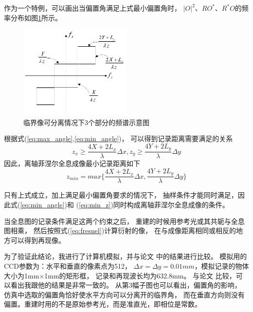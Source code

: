 \documentclass[11pt,a4paper]{article}
\begin{document}
作为一个特例，可以画出当偏置角满足上式最小偏置角时，
$|O|^2$、$RO^*$、$R^*O$的频率分布如图\ref{fig:spectrum}所示。
\begin{figure}[htb]
  \centering
  \includegraphics[width=0.5\textwidth]{spectrum.png}
  \caption{临界像可分离情况下3个部分的频谱示意图}
  \label{fig:spectrum}
\end{figure}

根据式(\ref{eq:max_angle},\ref{eq:min_angle})，
可以得到记录距离需要满足的关系
\begin{equation}
z_x\ge\frac{4X+2L_x}{\lambda}\Delta x,
z_y\ge\frac{4Y+2L_y}{\lambda}\Delta y
\end{equation}
因此，离轴菲涅尔全息成像最小记录距离如下
\begin{equation}
z_{min}=max\{\frac{4X+2L_x}{\lambda}\Delta x, \frac{4Y+2L_y}{\lambda}\Delta y\}
\label{eq:min_z}
\end{equation}

只有上式成立，加上满足最小偏置角要求的情况下，
抽样条件才能同时满足，因此式(\ref{eq:min_angle})和
(\ref{eq:min_z})同时构成离轴菲涅尔全息成像的条件。

当全息图的记录条件满足这两个约束之后，
重建的时候用参考光或其共轭与全息图相乘，
然后按照式(\ref{eq:fresnel})计算衍射的像，
在与成像距离相同或相反的地方可以得到再现像。

为了验证此结论，我进行了计算机模拟，并与论文\cite{王华英2008数字全息显微成像的理论和实验研究}
中的结果进行比较。
模拟用的CCD参数为：水平和垂直的像素点为512，
$\Delta x=\Delta y = 0.01mm$，模拟记录的物体大小为1mm$\times$1mm的矩形框，
记录和再现波长均为632.8mm。
与论文\cite{王华英2008数字全息显微成像的理论和实验研究}
比较，可以看出我跟他的结果是非常一致的。
从第3幅子图也可以看出，偏置角的影响，
仿真中选取的偏置角恰好使水平方向可以分离开的临界角，
而在垂直方向则没有偏置。重建时用的不是原始参考光，而是准直光，即相位是常数。
\end{document}
